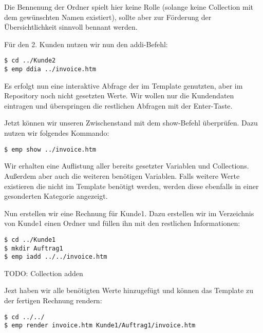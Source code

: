 Die Bennenung der Ordner spielt hier keine Rolle (solange keine Collection mit dem gewünschten Namen existiert), sollte aber zur Förderung der Übersichtlichkeit sinnvoll bennant werden.

Für den 2. Kunden nutzen wir nun den addi-Befehl:
\begin{lstlisting}[style=Bash]
$ cd ../Kunde2
$ emp ddia ../invoice.htm
\end{lstlisting}

Es erfolgt nun eine interaktive Abfrage der im Template genutzten, aber im Repository noch nicht gesetzten Werte. Wir wollen nur die Kundendaten eintragen und überspringen die restlichen Abfragen mit der Enter-Taste.

Jetzt können wir unseren Zwischenstand mit dem show-Befehl überprüfen. Dazu nutzen wir folgendes Kommando:
\begin{lstlisting}[style=Bash]
$ emp show ../invoice.htm
\end{lstlisting}

Wir erhalten eine Auflistung aller bereits gesetzter Variablen und Collections. Außerdem aber auch die weiteren benötigen Variablen. Falls weitere Werte existieren die nicht im Template benötigt werden, werden diese ebenfalls in einer gesonderten Kategorie angezeigt.

Nun erstellen wir eine Rechnung für Kunde1. Dazu erstellen wir im Verzeichnis von Kunde1 einen Ordner und füllen ihn mit den restlichen Informationen:

\begin{lstlisting}[style=Bash]
$ cd ../Kunde1
$ mkdir Auftrag1
$ emp iadd ../../invoice.htm
\end{lstlisting}

TODO: Collection adden

Jezt haben wir alle benötigten Werte hinzugefügt und können das Template zu der fertigen Rechnung rendern:
\begin{lstlisting}[style=Bash]
$ cd ../../
$ emp render invoice.htm Kunde1/Auftrag1/invoice.htm
\end{lstlisting}
